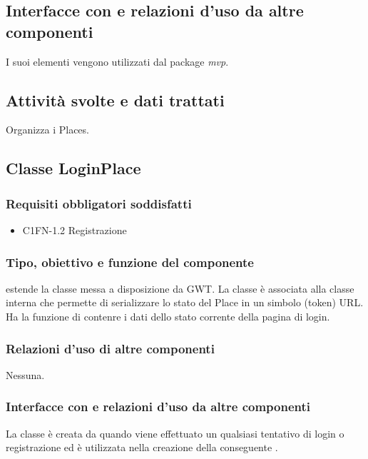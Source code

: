 \subsection*{Interfacce con
e relazioni d'uso da altre componenti} I suoi elementi vengono utilizzati dal package \emph{mvp}. 
\subsection*{Attivit\`a svolte e dati trattati} Organizza i Places.

\subsection{Classe LoginPlace}
\subsubsection*{Requisiti obbligatori soddisfatti}
\begin{itemize}
	\item C1FN-1.2 Registrazione
\end{itemize}
\subsubsection*{Tipo, obiettivo e funzione del componente}
 estende la classe  messa a disposizione da GWT. La
classe \`e associata alla classe interna  che permette di
serializzare lo stato del Place in un simbolo (token) URL.
Ha la funzione di contenre i dati dello stato corrente della pagina di login.
\subsubsection*{Relazioni d'uso di altre componenti}
Nessuna.
\subsubsection*{Interfacce con e relazioni d'uso da altre componenti}
La classe \`e creata da  quando viene effettuato un qualsiasi
tentativo di login o registrazione ed \`e utilizzata nella creazione della
conseguente . 
